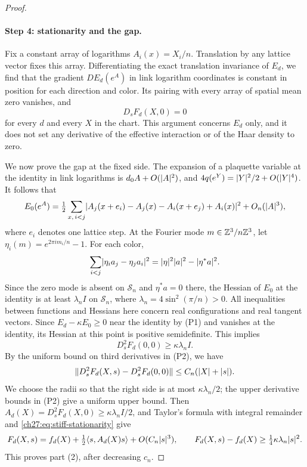 \begin{proof}
\paragraph{Step 4: stationarity and the gap.}
Fix a constant array of logarithms $A_i(x)=X_i/n$. Translation by any lattice vector fixes this array. Differentiating the exact translation invariance of $E_d$, we find that the gradient $DE_d(e^A)$ in link logarithm coordinates is constant in position for each direction and color. Its pairing with every array of spatial mean zero vanishes, and
\begin{equation}\label{ch27:eq:stiff-stationarity}
 D_sF_d(X,0)=0
\end{equation}
for every $d$ and every $X$ in the chart. This argument concerns $E_d$ only, and it does not set any derivative of the effective interaction or of the Haar density to zero.

We now prove the gap at the fixed side. The expansion of a plaquette variable at the identity in link logarithms is $d_0A+O(\lvert A\rvert^2)$, and $4q(e^Y)=\lvert Y\rvert^2/2+O(\lvert Y\rvert^4)$. It follows that
\[
 E_0(e^A)=\tfrac12\sum_{x,\,i<j}\lvert A_j(x+e_i)-A_j(x)-A_i(x+e_j)+A_i(x)\rvert^2+O_n(\lvert A\rvert^3),
\]
where $e_i$ denotes one lattice step. At the Fourier mode $m\in\mathbb Z^3/n\mathbb Z^3$, let $\eta_i(m)=e^{2\pi im_i/n}-1$. For each color,
\[
 \sum_{i<j}\lvert \eta_ia_j-\eta_ja_i\rvert^2=\lvert \eta\rvert^2\lvert a\rvert^2-\lvert \eta^*a\rvert^2.
\]
Since the zero mode is absent on $\mathcal S_n$ and $\eta^*a=0$ there, the Hessian of $E_0$ at the identity is at least $\lambda_nI$ on $\mathcal S_n$, where $\lambda_n=4\sin^2(\pi/n)>0$. All inequalities between functions and Hessians here concern real configurations and real tangent vectors. Since $E_d-\kappa E_0\ge0$ near the identity by (P1) and vanishes at the identity, its Hessian at this point is positive semidefinite. This implies
\[
 D_s^2F_d(0,0)\ge\kappa\lambda_nI.
\]
By the uniform bound on third derivatives in (P2), we have
\[
 \lVert D_s^2F_d(X,s)-D_s^2F_d(0,0)\rVert\le C_n(\lvert X\rvert+\lvert s\rvert).
\]
We choose the radii so that the right side is at most $\kappa\lambda_n/2$; the upper derivative bounds in (P2) give a uniform upper bound. Then $A_d(X)=D_s^2F_d(X,0)\ge\kappa\lambda_nI/2$, and Taylor's formula with integral remainder and \eqref{ch27:eq:stiff-stationarity} give
\[
 F_d(X,s)=f_d(X)+\tfrac12\langle s,A_d(X)s\rangle+O(C_n\lvert s\rvert^3),\qquad F_d(X,s)-f_d(X)\ge\tfrac14\kappa\lambda_n\lvert s\rvert^2.
\]
This proves part (2), after decreasing $c_n$.


\end{proof}
